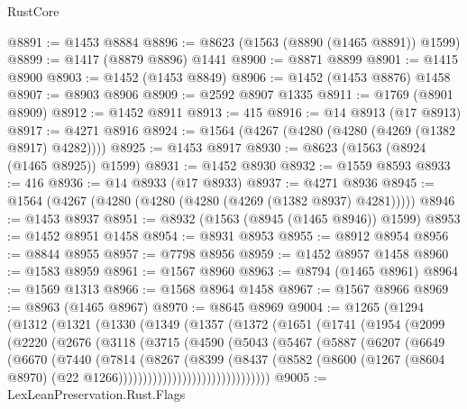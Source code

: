 \begin{lexlean}{RustCore}
\begin{coremodule}
@8891 := @1453 @8884
@8896 := @8623 (@1563 (@8890 (@1465 @8891)) @1599)
@8899 := @1417 (@8879 @8896) @1441
@8900 := @8871 @8899
@8901 := @1415 @8900
@8903 := @1452 (@1453 @8849)
@8906 := @1452 (@1453 @8876) @1458
@8907 := @8903 @8906
@8909 := @2592 @8907 @1335
@8911 := @1769 (@8901 @8909)
@8912 := @1452 @8911
@8913 := 415
@8916 := @14 @8913 (@17 @8913)
@8917 := @4271 @8916
@8924 := @1564 (@4267 (@4280 (@4280 (@4269 (@1382 @8917) @4282))))
@8925 := @1453 @8917
@8930 := @8623 (@1563 (@8924 (@1465 @8925)) @1599)
@8931 := @1452 @8930
@8932 := @1559 @8593
@8933 := 416
@8936 := @14 @8933 (@17 @8933)
@8937 := @4271 @8936
@8945 := @1564 (@4267 (@4280 (@4280 (@4280 (@4269 (@1382 @8937) @4281)))))
@8946 := @1453 @8937
@8951 := @8932 (@1563 (@8945 (@1465 @8946)) @1599)
@8953 := @1452 @8951 @1458
@8954 := @8931 @8953
@8955 := @8912 @8954
@8956 := @8844 @8955
@8957 := @7798 @8956
@8959 := @1452 @8957 @1458
@8960 := @1583 @8959
@8961 := @1567 @8960
@8963 := @8794 (@1465 @8961)
@8964 := @1569 @1313
@8966 := @1568 @8964 @1458
@8967 := @1567 @8966
@8969 := @8963 (@1465 @8967)
@8970 := @8645 @8969
@9004 := @1265
    (@1294
      (@1312
        (@1321
          (@1330
            (@1349
              (@1357
                (@1372
                  (@1651
                    (@1741
                      (@1954
                        (@2099
                          (@2220
                            (@2676
                              (@3118
                                (@3715
                                  (@4590
                                    (@5043
                                      (@5467
                                        (@5887
                                          (@6207
                                            (@6649
                                              (@6670
                                                (@7440
                                                  (@7814
                                                    (@8267
                                                      (@8399
                                                        (@8437
                                                          (@8582
                                                            (@8600
                                                              (@1267
                                                                (@8604 @8970)
                                                                (@22
                                                                  @1266)))))))))))))))))))))))))))))))
@9005 := LexLeanPreservation.Rust.Flags

\end{coremodule}
\end{lexlean}

